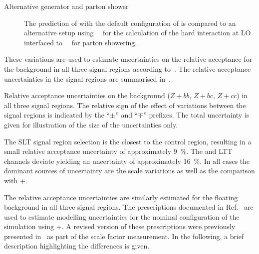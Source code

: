 \begin{description}
\item[Alternative generator and parton shower] The prediction of
  \Zjets with the default configuration of \SHERPA[2.2.1] is compared
  to an alternative setup using~\MGNLO[2.2.2]~\cite{Alwall:2014hca}
  for the calculation of the hard interaction at LO interfaced
  to~\PYTHIA[8.186]~\cite{Sjostrand:2007gs} for parton showering.

\end{description}
These variations are used to estimate uncertainties on the relative
acceptance for the \ZHF background in all
three signal regions according
to~. The relative acceptance
uncertainties in the signal regions are summarised
in~.

\begin{table}[htbp]
  \centering

  

  \caption{Relative acceptance uncertainties on the \ZHF background
    ($Z+bb$, $Z+bc$, $Z+cc$) in all three signal regions. The relative
    sign of the effect of variations between the signal regions is
    indicated by the ``$\pm$'' and ``$\mp$'' prefixes. The total
    uncertainty is given for illustration of the size of the
    uncertainties only.}
  \label{tab:uncertainties_zhf_extrapol}
\end{table}

The \lephad SLT signal region selection is the closest to the \ZHF
control region, resulting in a small relative acceptance uncertainty
of approximately \SI{9}{\percent}. The \hadhad and \lephad LTT
channels deviate yielding an uncertainty of approximately
\SI{16}{\percent}. In all cases the dominant sources of uncertainty
are the scale variations as well as the comparison with
\MGNLO+\PYTHIA[8].

The relative acceptance uncertainties are similarly estimated for the
floating \ttbar background in all three signal regions. The
prescriptions documented in Ref.~\cite{ATL-PHYS-PUB-2020-023} are used to
estimate modelling uncertainties for the nominal configuration of the
\ttbar simulation using \POWHEGBOX[v2]+\PYTHIA[8]. A revised version
of these prescriptions were previously presented
in~ as part of the \ttbarFakes scale
factor measurement. In the following, a brief description highlighting
the differences is given.

